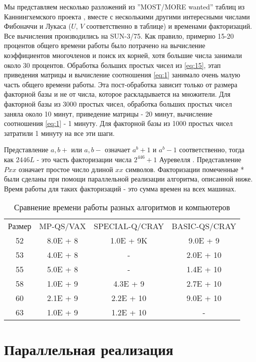 \documentclass[a4paper,12pt]{report}
\begin{document}
Мы представляем несколько разложений из ''MOST/MORE wanted'' таблиц из Каннингхемского проекта \cite{bull}, вместе с несколькими другими интересными числами Фибоначчи и Лукаса ($U$, $V$ соответственно в таблице) и временами факторизаций. Все вычисления производились на SUN-3/75. Как правило, примерно 15-20 процентов общего времени работы было потрачено на вычисление коэффициентов многочленов и поиск их корней, хотя большие числа занимали около 30 процентов. Обработка больших простых чисел из \eqref{eq:15}, этап приведения матрицы и вычисление соотношения \eqref{eq:1} занимало очень малую часть общего времени работы. Эта пост-обработка зависит только от размера факторной базы и не от числа, которое раскладывается на множители. Для факторной базы из 3000 простых чисел, обработка больших простых чисел заняла около 10 минут, приведение матрицы - 20 минут, вычисление соотношения \eqref{eq:1} - 1 минуту. Для факторной базы из 1000 простых чисел затратили 1 минуту на все эти шаги.

Представление $a,b+$ или $a,b-$ означает $a^b + 1$ и $a^b - 1$ соответственно, тогда как $2446L$ - это часть факторизации числа $2^446 + 1$ Ауревелля \cite{bull}. Представление $Pxx$ означает простое число длиной $xx$ символов. Факторизации помеченные * были сделаны при помощи параллельной реализации алгоритма, описанной ниже. Время работы для таких факторизаций - это сумма времен на всех машинах.

\begin{table}[h!]
	\centering
	\begin{tabular}{ c c c c }
		Размер & MP-QS/VAX &  SPECIAL-Q/CRAY & BASIC-QS/CRAY \\
		52 & 8.0E + 8 & 1.0E + 9K & 9.0E + 9\\
		53 & 4.0E + 8 & - & 2.0E + 10\\
		55 & 5.0E + 8 & - & 1.4E + 10\\
		58 & 1.0E + 9 & 4.3E + 9 & 2.7E + 10\\
		60 & 2.1E + 9 & 2.2E + 10 & 9.0E + 10\\
		63 & 1.0E + 9 & 1.2E + 10 & -
	\end{tabular}
	\caption{Сравнение времени работы разных алгоритмов и компьютеров}
	\label{Таблица:2}
\end{table}

\section{Параллельная реализация}
\end{document}
